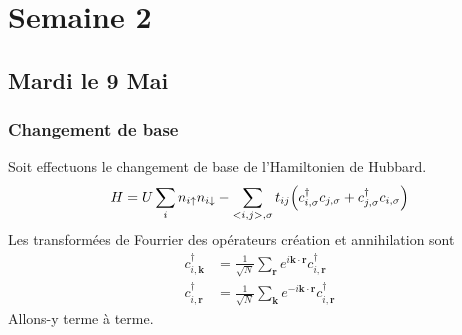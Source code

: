 \documentclass{subfiles}[../main.tex]
\begin{document}
    \section{Semaine 2} %
    \label{sec:Semaine 2}
        \subsection{Mardi le 9 Mai} %
        \label{sub:Mardi le 9 Mai}

            \subsubsection{Changement de base} %
            \label{sec:Changement de base}
            Soit effectuons le changement de base de l'Hamiltonien de Hubbard.
            \begin{align}
                H=U\sum_{i}n_{i\uparrow}n_{i\downarrow}
                -\sum_{<i,j>,\sigma}t_{ij}\qty(
                    c^\dagger_{i,\sigma}c_{j,\sigma}
                    +
                    c^\dagger_{j,\sigma}c_{i,\sigma}
                )
            \end{align}
            Les transformées de Fourrier des opérateurs création et
            annihilation sont
            \begin{align}
                c^\dagger_{i,\bm{k}}&=\frac{1}{\sqrt{N}}\sum_{\bm{r}}
                e^{i\bm{k}\cdot\bm{r}}
                c^\dagger_{i,\bm{r}}\\
                c^\dagger_{i,\bm{r}}&=\frac{1}{\sqrt{N}}\sum_{\bm{k}}
                e^{-i\bm{k}\cdot\bm{r}}
                c^\dagger_{i,\bm{r}}
            \end{align}
            Allons-y terme à terme.

\end{document}
